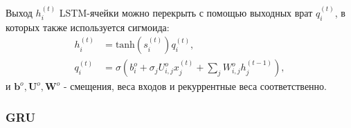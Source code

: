 Выход $h_i^{(t)}$ LSTM-ячейки можно перекрыть с помощью выходных врат 
$q_i^{(t)}$, в которых также используется сигмоида:
\begin{align*}
    h_i^{(t)} &= \text{tanh}(s_i^{(t)})q_i^{(t)}, \\[0.5em]
    q_i^{(t)} &= \sigma \left( 
        b_i^o + \sigma_j U_{i,j}^o x_j^{(t)} + \sum_j W_{i,j}^o h_j^{(t-1)}
    \right),
\end{align*}
и $\bm{b}^o, \bm{U}^o, \bm{W}^o$ - смещения, веса входов и рекуррентные веса соответственно.

\subsubsection{GRU}





